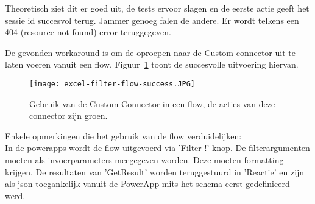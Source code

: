 Theoretisch ziet dit er goed uit, de tests ervoor slagen en de eerste actie geeft het sessie id succesvol terug. Jammer genoeg falen de andere. Er wordt telkens een 404 (resource not found) error teruggegeven.

De gevonden workaround is om de oproepen naar de Custom connector uit te laten voeren vanuit een flow. Figuur~\ref{fig:excel-filter-flow-success} toont de succesvolle uitvoering hiervan.

\begin{figure}[h!]
    \centering
    \texttt{[image: excel-filter-flow-success.JPG]}
    \caption{Gebruik van de Custom Connector in een flow, de acties van deze connector zijn groen.}
    \label{fig:excel-filter-flow-success}
\end{figure}

Enkele opmerkingen die het gebruik van de flow verduidelijken:\\
In de powerapps wordt de flow uitgevoerd via 'Filter !' knop.
De filterargumenten moeten als invoerparameters meegegeven worden. Deze moeten formatting krijgen.
De resultaten van 'GetResult' worden teruggestuurd in 'Reactie' en zijn als json toegankelijk vanuit de PowerApp mits het schema eerst gedefinieerd werd.
